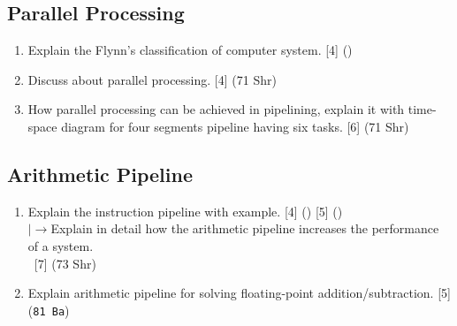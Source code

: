 \documentclass[12pt]{article}
\newcommand{\lb}{\\$\left|\rightarrow\right.$}
\newcommand{\enter}{\\\textcolor{white}{1}}
\begin{document}
	\subsection{Parallel Processing}
		\begin{enumerate}
			\item Explain the Flynn's classification of computer system. \hfill [4] ()

			\item Discuss about parallel processing. \hfill [4] (71 Shr)

			\item How parallel processing can be achieved in pipelining, explain it with time-space diagram for four segments pipeline having six tasks. \hfill [6] (71 Shr)
		\end{enumerate}

	\subsection{Arithmetic Pipeline}
		\begin{enumerate}
			\item Explain the instruction pipeline with example. \hfill [4] () [5] ()
			\lb Explain in detail how the arithmetic pipeline increases the performance of a system.
			\enter\hfill [7] (73 Shr)

			\item Explain arithmetic pipeline for solving floating-point addition/subtraction. \hfill [5] (\texttt{81 Ba})
			
		\end{enumerate}
\end{document}
